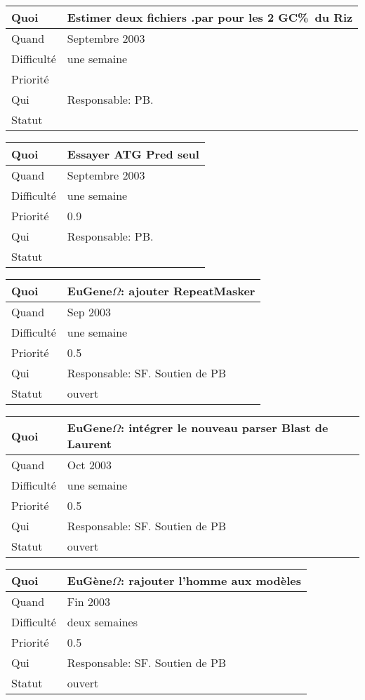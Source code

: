 \documentclass[a4paper,11pt]{article}
\begin{document}
\begin{longtable}{|l|p{7cm}|}\hline
  Quoi & Estimer deux fichiers .par pour les 2 GC\%\ du Riz\\\hline
  Quand  &  Septembre 2003\\\hline
  Difficult\'e &  une semaine\\\hline
  Priorit\'e &  \\\hline
  Qui & Responsable: PB.\\\hline
  Statut & \\\hline
\end{longtable}

\begin{longtable}{|l|p{7cm}|}\hline
  Quoi & Essayer ATG Pred seul\\\hline
  Quand  &  Septembre 2003\\\hline
  Difficult\'e &  une semaine \\\hline
  Priorit\'e &  0.9\\\hline
  Qui & Responsable: PB.\\\hline
  Statut & \\\hline
\end{longtable}

\begin{longtable}{|l|p{7cm}|}\hline
  Quoi & EuGene$\Omega$: ajouter RepeatMasker\\\hline
  Quand  & Sep 2003 \\\hline
  Difficult\'e & une semaine \\\hline
  Priorit\'e & 0.5 \\\hline
  Qui & Responsable: SF. Soutien de PB\\\hline
  Statut & ouvert\\\hline
\end{longtable}

\begin{longtable}{|l|p{7cm}|}\hline
  Quoi & EuGene$\Omega$: int\'egrer le nouveau parser Blast de Laurent\\\hline
  Quand  & Oct 2003 \\\hline
  Difficult\'e & une semaine \\\hline
  Priorit\'e & 0.5 \\\hline
  Qui & Responsable: SF. Soutien de PB\\\hline
  Statut & ouvert\\\hline
\end{longtable}

\begin{longtable}{|l|p{7cm}|}\hline
  Quoi & EuG\`ene$\Omega$: rajouter l'homme aux mod\`eles\\\hline
  Quand  & Fin 2003 \\\hline
  Difficult\'e &  deux semaines\\\hline
  Priorit\'e & 0.5 \\\hline
  Qui & Responsable: SF. Soutien de PB\\\hline
  Statut & ouvert\\\hline
\end{longtable}
\end{document}
